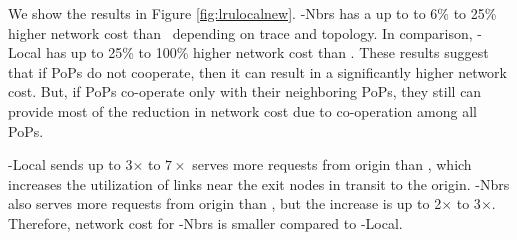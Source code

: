 \eat
{
We show the results in Figure \ref{fig:lrulocalnew}. \textsf{\invlru-Nbrs} has a up to  to 6\% to 25\% higher network cost than \invlru\ depending on trace and topology. In comparison, \textsf{\invlru-Local} has up to 25\% to 100\% higher network cost than \invlru.  These results suggest that if PoPs do not cooperate, then it can result in a significantly higher network cost. But, if PoPs co-operate only with their neighboring PoPs, they still can provide most of the reduction in network cost due to co-operation among all PoPs. 


\textsf{\invlru-Local}  sends up to 3$\times$ to $7\times$ serves more requests from origin than \invlru, which increases the utilization of links near the exit nodes in transit to the origin. 
\textsf{\invlru-Nbrs} also serves more requests from origin than \invlru, but the increase is up to 2$\times$ to 3$\times$. Therefore, network cost for \textsf{\invlru-Nbrs} is smaller compared to \textsf{\invlru-Local}.

}








